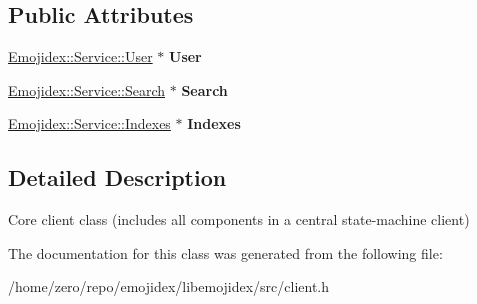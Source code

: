 \subsection*{Public Attributes}
\begin{DoxyCompactItemize}
\item 
\hyperlink{classEmojidex_1_1Service_1_1User}{Emojidex\+::\+Service\+::\+User} $\ast$ {\bfseries User}\hypertarget{classEmojidex_1_1Client_aa81c4d93a3c5f7c052ec51480940bcf9}{}\label{classEmojidex_1_1Client_aa81c4d93a3c5f7c052ec51480940bcf9}

\item 
\hyperlink{classEmojidex_1_1Service_1_1Search}{Emojidex\+::\+Service\+::\+Search} $\ast$ {\bfseries Search}\hypertarget{classEmojidex_1_1Client_a78ab88058c7ae2b4ca94912da4dde033}{}\label{classEmojidex_1_1Client_a78ab88058c7ae2b4ca94912da4dde033}

\item 
\hyperlink{classEmojidex_1_1Service_1_1Indexes}{Emojidex\+::\+Service\+::\+Indexes} $\ast$ {\bfseries Indexes}\hypertarget{classEmojidex_1_1Client_a1b05ff602e2be8497d6def01c52d5a23}{}\label{classEmojidex_1_1Client_a1b05ff602e2be8497d6def01c52d5a23}

\end{DoxyCompactItemize}


\subsection{Detailed Description}
Core client class (includes all components in a central state-\/machine client) 

The documentation for this class was generated from the following file\+:\begin{DoxyCompactItemize}
\item 
/home/zero/repo/emojidex/libemojidex/src/client.\+h\end{DoxyCompactItemize}
